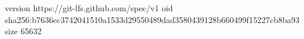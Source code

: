 version https://git-lfs.github.com/spec/v1
oid sha256:b7636ec3742041510a1533d29550489dad3580439128b660499f15227cb8ba93
size 65632
